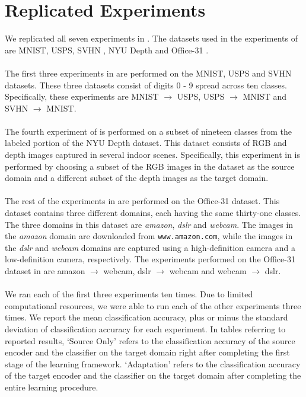 \documentclass[14pt]{extarticle}
\begin{document}
		\section{Replicated Experiments}
		We replicated all seven experiments in \cite{adda}. The datasets used in the experiments of \cite{adda} are MNIST, USPS, SVHN \cite{svhn}, NYU Depth \cite{nyud2} and Office-31 \cite{office31}.\\\\
		The first three experiments in \cite{adda} are performed on the MNIST, USPS and SVHN datasets. These three datasets consist of digits 0 - 9 spread across ten classes. Specifically, these experiments are MNIST $\rightarrow$ USPS, USPS $\rightarrow$ MNIST and SVHN $\rightarrow$ MNIST.\\\\
		The fourth experiment of \cite{adda} is performed on a subset of nineteen classes from the labeled portion of the NYU Depth dataset. This dataset consists of RGB and depth images captured in several indoor scenes. Specifically, this experiment in \cite{adda} is performed by choosing a subset of the RGB images in the dataset as the source domain and a different subset of the depth images as the target domain.\\\\
		The rest of the experiments in \cite{adda} are performed on the Office-31 dataset. This dataset contains three different domains, each having the same thirty-one classes. The three domains in this dataset are \textit{amazon}, \textit{dslr} and \textit{webcam}. The images in the \textit{amazon} domain are downloaded from \texttt{www.amazon.com}, while the images in the \textit{dslr} and \textit{webcam} domains are captured using a high-definition camera and a low-definition camera, respectively. The experiments performed on the Office-31 dataset in \cite{adda} are amazon $\rightarrow$ webcam, dslr $\rightarrow$ webcam and webcam $\rightarrow$ dslr.\\\\
		We ran each of the first three experiments ten times. Due to limited computational resources, we were able to run each of the other experiments three times. We report the mean classification accuracy, plus or minus the standard deviation of classification accuracy for each experiment. In tables referring to reported results, `Source Only' refers to the classification accuracy of the source encoder and the classifier on the target domain right after completing the first stage of the learning framework. `Adaptation' refers to the classification accuracy of the target encoder and the classifier on the target domain after completing the entire learning procedure.
\end{document}
